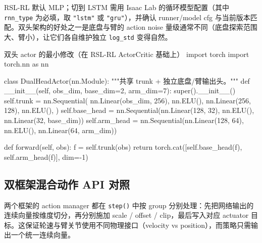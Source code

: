 RSL-RL 默认 MLP；切到 LSTM 需用 Isaac Lab 的循环模型配置（其中 \verb|rnn_type| 为必填，取 \verb|"lstm"| 或 \verb|"gru"|），并确认 runner/model cfg 与当前版本匹配。双头架构的好处之一是底盘与臂的 action noise 量级通常不同（底盘探索范围大、臂小），让它们各自维护独立 \verb|log_std| 变得自然。

\begin{codebox}[Python]{双头 actor 的最小修改（在 RSL-RL ActorCritic 基础上）}
import torch
import torch.nn as nn

class DualHeadActor(nn.Module):
    """共享 trunk + 独立底盘/臂输出头。"""
    def __init__(self, obs_dim, base_dim=2, arm_dim=7):
        super().__init__()
        self.trunk = nn.Sequential(
            nn.Linear(obs_dim, 256), nn.ELU(),
            nn.Linear(256, 128), nn.ELU(),
        )
        self.base_head = nn.Sequential(nn.Linear(128, 32), nn.ELU(), nn.Linear(32, base_dim))
        self.arm_head  = nn.Sequential(nn.Linear(128, 64), nn.ELU(), nn.Linear(64, arm_dim))

    def forward(self, obs):
        f = self.trunk(obs)
        return torch.cat([self.base_head(f), self.arm_head(f)], dim=-1)
\end{codebox}

\subsection{双框架混合动作 API 对照}
\label{sec:rlmc-wh-action-api}

两个框架的 action manager 都在 \verb|step()| 中按 group 分别处理：先把网络输出的连续向量按维度切分，再分别施加 scale / offset / clip，最后写入对应 actuator 目标。这保证轮速与臂关节使用不同物理接口（velocity vs position），而策略只需输出一个统一连续向量。

